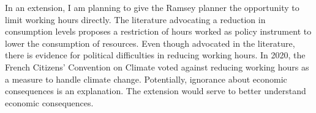 


In an extension, I am planning to give the Ramsey planner the opportunity to limit working hours directly. The literature advocating a reduction in consumption levels \cite{Schor2005SustainableReduction} proposes a restriction of hours worked as policy instrument to lower the consumption of resources.
Even though advocated in the literature, there is evidence for political difficulties in reducing working hours. In 2020, the French Citizens' Convention on Climate voted against reducing working hours as a measure to handle climate change. Potentially, ignorance about economic consequences is an explanation. The extension would serve to better understand economic consequences. 



\begin{comment}
\paragraph{Extension: What if the low skilled get a higher share \ar they reduce even less \ar more fossil input supply}

Redistribution to households with a higher marginal propensity to consume emissions counteracts the externality. This effect is amplified by a market size effect  of dirty goods. 

content...
\end{comment}

